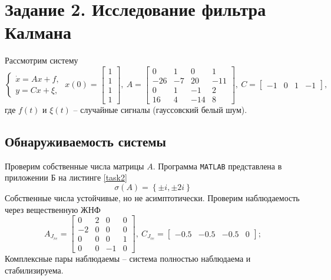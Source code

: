 \documentclass[a4paper, 12pt]{article}
\begin{document}
    \section{Задание 2. Исследование фильтра Калмана}
    Рассмотрим систему
    $$
    \begin{cases}
        \dot{x}=Ax+f,\\
        y=Cx+\xi,
    \end{cases}\ x(0)=\begin{bmatrix}
        1\\1\\1\\1
    \end{bmatrix},\ A=\begin{bmatrix}
        0 &1 &0 &1\\
        -26 &-7 &20 &-11\\
        0 &1 &-1 &2\\
        16 &4 &-14 &8
    \end{bmatrix},\ C=\begin{bmatrix}
        -1 &0 &1 &-1
    \end{bmatrix},
    $$
    где $f(t)$ и $\xi(t)$ -- случайные сигналы (гауссовский белый шум).


    \subsection{Обнаруживаемость системы}
    Проверим собственные числа матрицы $A$. Программа \texttt{MATLAB} представлена
    в приложении Б на листинге \ref{task2}
    $$
    \sigma\left( A \right)=\left\{ \pm i,\pm2i \right\}
    $$
    Собственные числа устойчивые, но не асимптотически. Проверим наблюдаемость через
    вещественную ЖНФ
    $$
    A_{J_{re}}=\begin{bmatrix}
        0    &2   &0    &0\\
   -2   &0    &0   &0\\
    0   &0    &0    &1\\
   0   &0   &-1   &0
    \end{bmatrix},\ C_{J_{re}}=\begin{bmatrix}
        -0.5   &-0.5   &-0.5  &0
    \end{bmatrix};
    $$
    Комплексные пары наблюдаемы -- система полностью наблюдаема и стабилизируема.
\end{document}
